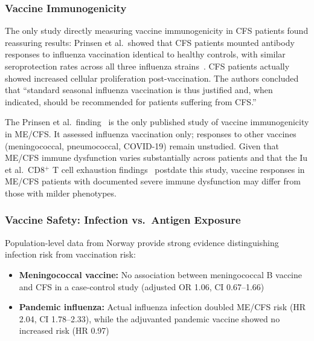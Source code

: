 \subsubsection{Vaccine Immunogenicity}

The only study directly measuring vaccine immunogenicity in CFS patients found reassuring results: Prinsen et al.\ showed that CFS patients mounted antibody responses to influenza vaccination identical to healthy controls, with similar seroprotection rates across all three influenza strains~\cite{Prinsen2012vaccine}. CFS patients actually showed increased cellular proliferation post-vaccination. The authors concluded that ``standard seasonal influenza vaccination is thus justified and, when indicated, should be recommended for patients suffering from CFS.''

\begin{limitation}
The Prinsen et al.\ finding~\cite{Prinsen2012vaccine} is the only published study of vaccine immunogenicity in ME/CFS. It assessed influenza vaccination only; responses to other vaccines (meningococcal, pneumococcal, COVID-19) remain unstudied. Given that ME/CFS immune dysfunction varies substantially across patients and that the Iu et al.\ CD8$^+$ T cell exhaustion findings~\cite{iu2024tcell_exhaustion} postdate this study, vaccine responses in ME/CFS patients with documented severe immune dysfunction may differ from those with milder phenotypes.
\end{limitation}

\subsubsection{Vaccine Safety: Infection vs.\ Antigen Exposure}

Population-level data from Norway provide strong evidence distinguishing infection risk from vaccination risk:

\begin{itemize}
    \item \textbf{Meningococcal vaccine:} No association between meningococcal B vaccine and CFS in a case-control study (adjusted OR 1.06, CI 0.67--1.66)~\cite{Magnus2009meningococcal}
    \item \textbf{Pandemic influenza:} Actual influenza infection doubled ME/CFS risk (HR 2.04, CI 1.78--2.33), while the adjuvanted pandemic vaccine showed no increased risk (HR 0.97)~\cite{Magnus2015influenza}
\end{itemize}

